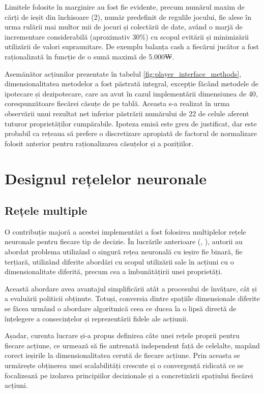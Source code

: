 Limitele folosite în marginire au fost fie evidente, precum numărul maxim de cărți de ieșit din închisoare (2), număr predefinit de regulile jocului, fie alese în urma rulării mai multor mii de jocuri și colectării de date, având o marjă de incrementare considerabilă (aproximativ 30\%) cu scopul evitării și minimizării utilizării de valori supraunitare. De exemplu balanța cash a fiecărui jucător a fost raționalizată în funcție de o sumă maximă de 5.000₩.

Asemănător acțiunilor prezentate în tabelul \ref{fig:player_interface_methods}, dimensionalitatea metodelor a fost păstrată integral, excepție făcând metodele de ipotecare și dezipotecare, care au avut în cazul implementării dimensiunea de 40, corespunzătoare fiecărei căsuțe de pe tablă. Aceasta s-a realizat în urma observării unui rezultat net inferior păstrării numărului de 22 de celule aferent tuturor proprietăților cumpărabile. Ipoteza emisă este greu de justificat, dar este probabil ca rețeaua să prefere o discretizare apropiată de factorul de normalizare folosit anterior pentru raționalizarea căsuțelor și a pozițiilor.

\section{Designul rețelelor neuronale}
\subsection{Rețele multiple}
O contribuție majoră a acestei implementări a fost folosirea multiplelor rețele neuronale pentru fiecare tip de decizie. În lucrările anterioare (\cite{mdp_monopoly_2}, \cite{hybrid_monopoly}), autorii au abordat problema utilizând o singură rețea neuronală cu ieșire fie binară, fie terțiară, utilizând diferite abordări cu scopul utilizării sale în acțiuni cu o dimensionalitate diferită, precum cea a îmbunătățirii unei proprietăți.

Această abordare avea avantajul simplificării atât a procesului de învățare, cât și a evaluării politicii obținute. Totuși, conversia dintre spațiile dimensionale diferite se făcea urmând o abordare algoritmică ceea ce ducea la o lipsă directă de înțelegere a consecințelor și reprezentării fidele ale acțiunii.

Așadar, curenta lucrare și-a propus definirea câte unei rețele proprii pentru fiecare acțiune, ce urmează să fie antrenată independent față de celelalte, mapând corect ieșirile la dimensionalitatea cerută de fiecare acțiune. Prin aceasta se urmărește obținerea unei scalabilități crescute și o convergență ridicată ce se focalizează pe izolarea principiilor decizionale și a concretizării spațiului fiecărei acțiuni.

